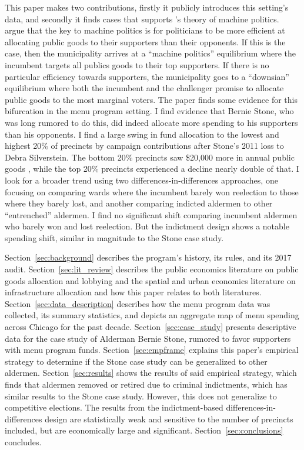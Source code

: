 This paper makes two contributions, firstly it publicly introduces this setting's data, and secondly it finds cases that supports \cite{dixit_londregan1996}'s theory of machine politics.
\cite{dixit_londregan1996} argue that the key to machine politics is for politicians to be more efficient at allocating public goods to their supporters than their opponents.
If this is the case, then the municipality arrives at a ``machine politics'' equilibrium where the incumbent targets all publics goods to their top supporters.
If there is no particular efficiency towards supporters, the municipality goes to a ``downsian'' equilibrium where both the incumbent and the challenger promise to allocate public goods to the most marginal voters.
The paper finds some evidence for this bifurcation in the menu program setting.
I find evidence that Bernie Stone, who was long rumored to do this, did indeed allocate more spending to his supporters than his opponents.
I find a large swing in fund allocation to the lowest and highest 20\% of precincts by campaign contributions after Stone's 2011 loss to Debra Silverstein. 
The bottom 20\% precincts saw \$20,000 more in annual public goods , while the top 20\% precincts experienced a decline nearly double of that.
I look for a broader trend using two differences-in-differences approaches, one focusing on comparing wards where the incumbent barely won reelection to those where they barely lost, and another comparing indicted aldermen to other ``entrenched'' aldermen.
I find no significant shift comparing incumbent aldermen who barely won and lost reelection.
But the indictment design shows a notable spending shift, similar in magnitude to the Stone case study.



Section~\ref{sec:background} describes the program's history, its rules, and its 2017 audit.
Section~\ref{sec:lit_review} describes the public economics literature on public goods allocation and lobbying and the spatial and urban economics literature on infrastructure allocation and how this paper relates to both literatures.
Section~\ref{sec:data_description} describes how the menu program data was collected, its summary statistics, and depicts an aggregate map of menu spending across Chicago for the past decade.
Section~\ref{sec:case_study} presents descriptive data for the case study of Alderman Bernie Stone, rumored to favor supporters with menu program funds. 
Section~\ref{sec:empframe} explains this paper's empirical strategy to determine if the Stone case study can be generalized to other aldermen.
Section~\ref{sec:results} shows the results of said empirical strategy, which finds that aldermen removed or retired due to criminal indictments, which has similar results to the Stone case study. 
However, this does not generalize to competitive elections.
The results from the indictment-based differences-in-differences design are statistically weak and sensitive to the number of precincts included, but are economically large and significant.
Section~\ref{sec:conclusions} concludes.

